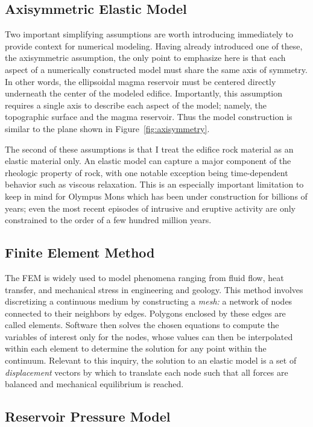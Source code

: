 \subsection{Axisymmetric Elastic Model}

Two important simplifying assumptions are worth introducing immediately to provide context for numerical modeling. Having already introduced one of these, the axisymmetric assumption, the only point to emphasize here is that each aspect of a numerically constructed model must share the same axis of symmetry. In other words, the ellipsoidal magma reservoir must be centered directly underneath the center of the modeled edifice. Importantly, this assumption requires a single axis to describe each aspect of the model; namely, the topographic surface and the magma reservoir. Thus the model construction is similar to the plane shown in Figure~\ref{fig:axisymmetry}.

The second of these assumptions is that I treat the edifice rock material as an elastic material only. An elastic model can capture a major component of the rheologic property of rock, with one notable exception being time-dependent behavior such as viscous relaxation. This is an especially important limitation to keep in mind for Olympus Mons which has been under construction for billions of years; even the most recent episodes of intrusive and eruptive activity are only constrained to the order of a few hundred million years.

\subsection{Finite Element Method}

The \ac{FEM} is widely used to model phenomena ranging from fluid flow, heat transfer, and mechanical stress in engineering and geology. This method involves discretizing a continuous medium by constructing a \emph{mesh:} a network of nodes connected to their neighbors by edges. Polygons enclosed by these edges are called elements. Software then solves the chosen equations to compute the variables of interest only for the nodes, whose values can then be interpolated within each element to determine the solution for any point within the continuum. Relevant to this inquiry, the solution to an elastic model is a set of \emph{displacement} vectors by which to translate each node such that all forces are balanced and mechanical equilibrium is reached.

\subsection{Reservoir Pressure Model}

